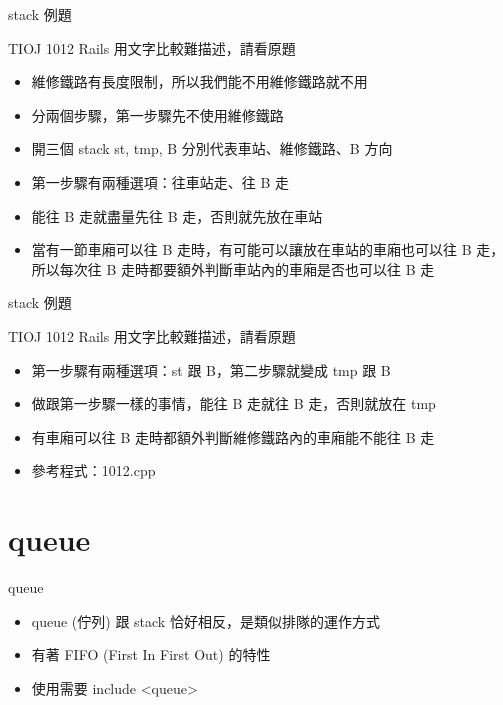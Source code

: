 \documentclass[aspectratio=169]{beamer}
\begin{document}
    \begin{frame}{stack 例題}
        \begin{block}{TIOJ 1012 Rails}
            用文字比較難描述，請看原題
        \end{block}

        \begin{itemize}
            \item<2-> 維修鐵路有長度限制，所以我們能不用維修鐵路就不用
            \item<3-> 分兩個步驟，第一步驟先不使用維修鐵路
            \item<4-> 開三個 stack st, tmp, B 分別代表車站、維修鐵路、B 方向
            \item<5-> 第一步驟有兩種選項：往車站走、往 B 走
            \item<6-> 能往 B 走就盡量先往 B 走，否則就先放在車站
            \item<7-> 當有一節車廂可以往 B 走時，有可能可以讓放在車站的車廂也可以往 B 走，所以每次往 B 走時都要額外判斷車站內的車廂是否也可以往 B 走
        \end{itemize}
    \end{frame}

    \begin{frame}{stack 例題}
        \begin{block}{TIOJ 1012 Rails}
            用文字比較難描述，請看原題
        \end{block}

        \begin{itemize}
            \item<1-> 第一步驟有兩種選項：st 跟 B，第二步驟就變成 tmp 跟 B
            \item<2-> 做跟第一步驟一樣的事情，能往 B 走就往 B 走，否則就放在 tmp
            \item<3-> 有車廂可以往 B 走時都額外判斷維修鐵路內的車廂能不能往 B 走
            \item<4-> 參考程式：1012.cpp
        \end{itemize}
    \end{frame}

    \section{queue}

    \begin{frame}{queue}
        \begin{itemize}
            \item<1-> queue (佇列) 跟 stack 恰好相反，是類似排隊的運作方式
            \item<2-> 有著 FIFO (First In First Out) 的特性
            \item<2-> 使用需要 include <queue>
        \end{itemize}
    \end{frame}
\end{document}
